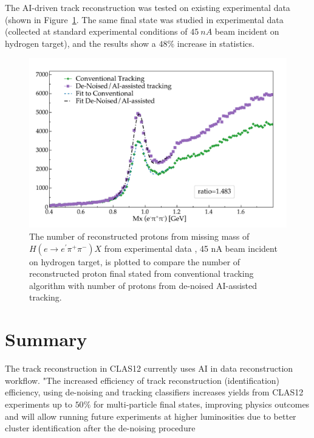 \documentclass{webofc}
\begin{document}
The AI-driven track reconstruction was tested on existing experimental data (shown in Figure~\ref{physics::conv_vs_dnai}. The same final state 
was studied in experimental data (collected at standard experimental conditions of $45~nA$ beam incident on hydrogen target), and the results
show a $48\%$ increase in statistics.

\begin{figure}[!h]
\begin{center}
 \includegraphics[height=2.in]{images/rga_conv_vs_dnai.pdf}
\caption { 
The number of reconstructed protons from missing mass of $H(e \rightarrow e^\prime \pi^+ \pi^-) X$ from experimental data 
, 45 nA beam incident on hydrogen target, is plotted to compare the number of reconstructed proton final stated from conventional tracking algorithm with 
number of protons from de-noised AI-assisted tracking. 
}
 \label{physics::conv_vs_dnai}
 \end{center}
\end{figure}

\section{Summary}
\label{section-summary}

The track reconstruction in CLAS12 currently uses AI in data reconstruction workflow. "The increased efficiency of track reconstruction (identification) efficiency,
using de-noising and tracking classifiers increases yields from CLAS12 experiments up to $50\%$ for multi-particle final states, improving physics outcomes and will allow running future experiments at higher luminosities due to better cluster identification after the de-noising procedure

\end{document}
